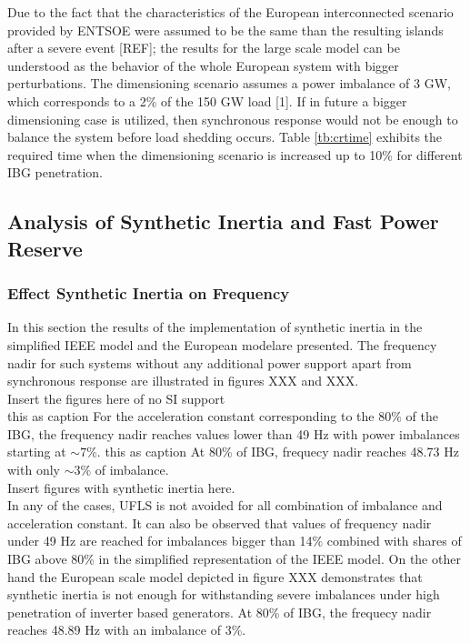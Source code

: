 
Due to the fact that the characteristics of the  European interconnected scenario provided by ENTSOE were assumed to be the same than the resulting islands after a severe event [REF]; the results for the large scale model can be understood as the behavior of the whole European system with bigger perturbations. The dimensioning scenario assumes a power imbalance of 3 GW, which corresponds to a 2\% of the 150 GW load [1]. If in future a bigger dimensioning case is utilized, then synchronous response would not be enough to balance the system before load shedding occurs. Table \ref{tb:crtime} exhibits the required time when the dimensioning scenario is increased up to 10\% for different IBG penetration.



\subsection{Analysis of Synthetic Inertia and Fast Power Reserve}

\subsubsection{Effect Synthetic Inertia on Frequency}

In this section the results of the implementation of synthetic inertia in the simplified IEEE model and the European modelare presented. The frequency nadir for such systems without any additional power support apart from synchronous response are illustrated in figures XXX and XXX. \\



Insert the figures here of no SI support\\

this as caption For the acceleration constant corresponding to the 80\% of the IBG, the frequency nadir reaches values lower than 49 Hz with power imbalances starting at $ \sim 7\% $.
this as caption At 80\% of IBG, frequecy nadir reaches 48.73 Hz with only $\sim 3\% $ of imbalance. \\


Insert figures with synthetic inertia here.
\\
In any of the cases, UFLS is not avoided for all combination of imbalance and acceleration constant. It can also be observed that values of frequency nadir under 49 Hz are reached for imbalances bigger than 14\% combined with shares of IBG above 80\% in the simplified representation of the IEEE model. On the other hand the European scale model depicted in figure XXX demonstrates that synthetic inertia is not enough for withstanding severe imbalances under high penetration of inverter based generators. At 80\% of IBG, the frequecy nadir reaches 48.89 Hz with an imbalance of 3\%. \\


